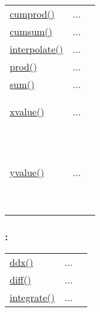 \textcolor{blue}{}\begin{tabular}{>{\raggedleft}b{3cm}>{\centering}b{0.5cm}>{\raggedright}b{12cm}}
\textcolor{blue}{\hyperlink{cumprod}{cumprod()}}&
...&
 \begin{NoHyper} \nameref{par:Cumulative-product} \end{NoHyper}\tabularnewline
\textcolor{blue}{\hyperlink{cumsum}{cumsum()}}&
...&
 \begin{NoHyper} \nameref{par:Cumulative-sum} \end{NoHyper}\tabularnewline
\textcolor{blue}{\hyperlink{interpolate}{interpolate()}}&
...&
 \begin{NoHyper} \nameref{par:spline-interpolation} \end{NoHyper}\tabularnewline
\textcolor{blue}{\hyperlink{prod}{prod()}}&
...&
 \begin{NoHyper} \nameref{par:Prod} \end{NoHyper}\tabularnewline
\textcolor{blue}{\hyperlink{sum}{sum()}}&
...&
 \begin{NoHyper} \nameref{par:Sum} \end{NoHyper}\tabularnewline
\textcolor{blue}{\hyperlink{xvalue}{xvalue()}}

\textcolor{blue}{~}&
...

\textcolor{blue}{~}&
 \begin{NoHyper} \nameref{par:xvalue} \end{NoHyper}\tabularnewline
\textcolor{blue}{\hyperlink{yvalue}{yvalue()}}

\textcolor{blue}{~}&
...

\textcolor{blue}{~}&
 \begin{NoHyper} \nameref{par:yvalue} \end{NoHyper}\tabularnewline
\end{tabular}


\subsubsection*{: }

\textcolor{blue}{}\begin{tabular}{>{\raggedleft}p{3cm}>{\centering}p{0.5cm}l}
\textcolor{blue}{\hyperlink{ddx}{ddx()}}&
...&
 \begin{NoHyper} \nameref{par:Differentiate-Symbolicly} \end{NoHyper}\tabularnewline
\textcolor{blue}{\hyperlink{diff}{diff()}}&
...&
 \begin{NoHyper} \nameref{par:Differentiate} \end{NoHyper}\tabularnewline
\textcolor{blue}{\hyperlink{integrate}{integrate()}}&
...&
 \begin{NoHyper} \nameref{par:Integrate} \end{NoHyper}\tabularnewline
\end{tabular}



